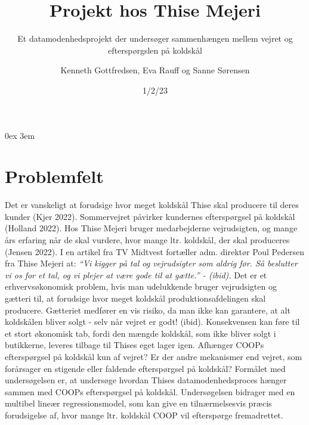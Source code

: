 \documentclass[
  12pt,
  a4paper,
  DIV=11,
  numbers=noendperiod]{scrartcl}
\title{Projekt hos Thise Mejeri}
\subtitle{Et datamodenhedsprojekt der undersøger sammenhængen mellem
vejret og efterspørgslen på koldskål}
\author{Kenneth Gottfredsen, Eva Rauff og Sanne Sørensen}
\date{1/2/23}
\renewcommand*\contentsname{Table of contents}
\newcommand\contentsname{Table of contents}
\begin{document}
\maketitle
\ifdefined\Shaded\renewenvironment{Shaded}{\begin{tcolorbox}[boxrule=0pt, breakable, borderline west={3pt}{0pt}{shadecolor}, enhanced, sharp corners, frame hidden, interior hidden]}{\end{tcolorbox}}\fi

\renewcommand*\contentsname{Indholdsfortegnelse}
{
\hypersetup{linkcolor=}
\setcounter{tocdepth}{3}
\tableofcontents
}
\setcounter{page}{1} 
\parindent 0ex
\emergencystretch 3em
\pagestyle{fancy}
\fancyhead{}
\fancyfoot{}
\fancyfoot[C]{\thepage}
\renewcommand{\headrulewidth}{0.5pt}
\renewcommand{\footrulewidth}{0.5pt}

\hypertarget{problemfelt}{%
\section{Problemfelt}\label{problemfelt}}

Det er vanskeligt at forudsige hvor meget koldskål Thise skal producere
til deres kunder (Kjer 2022). Sommervejret påvirker kundernes
efterspørgsel på koldskål (Holland 2022). Hos Thise Mejeri bruger
medarbejderne vejrudsigten, og mange års erfaring når de skal vurdere,
hvor mange ltr. koldskål, der skal produceres (Jensen 2022). I en
artikel fra TV Midtvest fortæller adm. direktør Poul Pedersen fra Thise
Mejeri at: \emph{``Vi kigger på tal og vejrudsigter som aldrig før. Så
beslutter vi os for et tal, og vi plejer at være gode til at gætte.'' -
(ibid).} Det er et erhvervsøkonomisk problem, hvis man udelukkende
bruger vejrudsigten og gætteri til, at forudsige hvor meget koldskål
produktionsafdelingen skal producere. Gætteriet medfører en vis risiko,
da man ikke kan garantere, at alt koldskålen bliver solgt - selv når
vejret er godt! (ibid). Konsekvensen kan føre til et stort økonomisk
tab, fordi den mængde koldskål, som ikke bliver solgt i butikkerne,
leveres tilbage til Thises eget lager igen. Afhænger COOPs efterspørgsel
på koldskål kun af vejret? Er der andre mekanismer end vejret, som
forårsager en stigende eller faldende efterspørgsel på koldskål?
Formålet med undersøgelsen er, at undersøge hvordan Thises
datamodenhedsproces hænger sammen med COOPs efterspørgsel på koldskål.
Undersøgelsen bidrager med en multibel lineær regressionsmodel, som kan
give en tilnærmelsesvis præcis forudsigelse af, hvor mange ltr. koldskål
COOP vil efterspørge fremadrettet.
\end{document}
